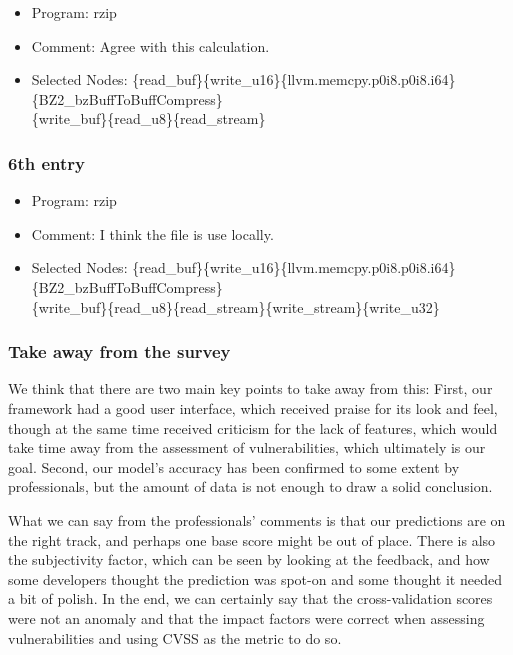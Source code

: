 \begin{itemize}
	\item Program: rzip
	\item Comment: Agree with this calculation.
	\item Selected Nodes: \{read\_buf\}\{write\_u16\}\{llvm.memcpy.p0i8.p0i8.i64\}\{BZ2\_bzBuffToBuffCompress\}\\\{write\_buf\}\{read\_u8\}\{read\_stream\}
\end{itemize}

\subsubsection{6th entry}

\begin{itemize}
	\item Program: rzip
	\item Comment: I think the file is use locally.
	\item Selected Nodes: \{read\_buf\}\{write\_u16\}\{llvm.memcpy.p0i8.p0i8.i64\}\{BZ2\_bzBuffToBuffCompress\}\\\{write\_buf\}\{read\_u8\}\{read\_stream\}\{write\_stream\}\{write\_u32\}
	
\end{itemize}

\subsubsection{Take away from the survey}

We think that there are two main key points to take away from this: First, our framework had a good user interface, which received praise for its look and feel, though at the same time received criticism for the lack of features, which would take time away from the assessment of vulnerabilities, which ultimately is our goal. Second, our model's accuracy has been confirmed to some extent by professionals, but the amount of data is not enough to draw a solid conclusion.

What we can say from the professionals' comments is that our predictions are on the right track, and perhaps one base score might be out of place. There is also the subjectivity factor, which can be seen by looking at the feedback, and how some developers thought the prediction was spot-on and some thought it needed a bit of polish. In the end, we can certainly say that the cross-validation scores were not an anomaly and that the impact factors were correct when assessing vulnerabilities and using CVSS as the metric to do so.

